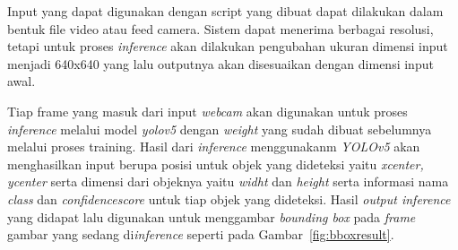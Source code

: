 
\par Input yang dapat digunakan dengan script yang dibuat dapat dilakukan dalam bentuk file video atau feed camera. Sistem dapat menerima berbagai resolusi, tetapi untuk proses \emph{inference} akan dilakukan pengubahan ukuran dimensi input menjadi 640x640 yang lalu outputnya akan disesuaikan dengan dimensi input awal.


\par Tiap frame yang masuk dari input \emph{webcam} akan digunakan untuk proses \emph{inference} melalui model \emph{yolov5} dengan \emph{weight} yang sudah dibuat sebelumnya melalui proses training. Hasil dari \emph{inference} menggunakanm \emph{YOLOv5} akan menghasilkan input berupa posisi untuk objek yang dideteksi yaitu \emph{xcenter, ycenter} serta dimensi dari objeknya yaitu \emph{widht} dan \emph{height} serta informasi nama \emph{class} dan \emph{confidence\textunderscore score} untuk tiap objek yang dideteksi. Hasil \emph{output inference} yang didapat lalu digunakan untuk menggambar \emph{bounding box} pada \emph{frame} gambar yang sedang di\emph{inference} seperti pada Gambar~\ref{fig:bboxresult}.


